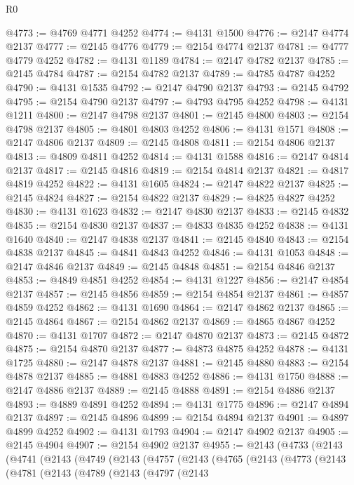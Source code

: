 \begin{lexlean}{R0}
\begin{coremodule}
@4773 := @4769 @4771 @4252
@4774 := @4131 @1500
@4776 := @2147 @4774 @2137
@4777 := @2145 @4776
@4779 := @2154 @4774 @2137
@4781 := @4777 @4779 @4252
@4782 := @4131 @1189
@4784 := @2147 @4782 @2137
@4785 := @2145 @4784
@4787 := @2154 @4782 @2137
@4789 := @4785 @4787 @4252
@4790 := @4131 @1535
@4792 := @2147 @4790 @2137
@4793 := @2145 @4792
@4795 := @2154 @4790 @2137
@4797 := @4793 @4795 @4252
@4798 := @4131 @1211
@4800 := @2147 @4798 @2137
@4801 := @2145 @4800
@4803 := @2154 @4798 @2137
@4805 := @4801 @4803 @4252
@4806 := @4131 @1571
@4808 := @2147 @4806 @2137
@4809 := @2145 @4808
@4811 := @2154 @4806 @2137
@4813 := @4809 @4811 @4252
@4814 := @4131 @1588
@4816 := @2147 @4814 @2137
@4817 := @2145 @4816
@4819 := @2154 @4814 @2137
@4821 := @4817 @4819 @4252
@4822 := @4131 @1605
@4824 := @2147 @4822 @2137
@4825 := @2145 @4824
@4827 := @2154 @4822 @2137
@4829 := @4825 @4827 @4252
@4830 := @4131 @1623
@4832 := @2147 @4830 @2137
@4833 := @2145 @4832
@4835 := @2154 @4830 @2137
@4837 := @4833 @4835 @4252
@4838 := @4131 @1640
@4840 := @2147 @4838 @2137
@4841 := @2145 @4840
@4843 := @2154 @4838 @2137
@4845 := @4841 @4843 @4252
@4846 := @4131 @1053
@4848 := @2147 @4846 @2137
@4849 := @2145 @4848
@4851 := @2154 @4846 @2137
@4853 := @4849 @4851 @4252
@4854 := @4131 @1227
@4856 := @2147 @4854 @2137
@4857 := @2145 @4856
@4859 := @2154 @4854 @2137
@4861 := @4857 @4859 @4252
@4862 := @4131 @1690
@4864 := @2147 @4862 @2137
@4865 := @2145 @4864
@4867 := @2154 @4862 @2137
@4869 := @4865 @4867 @4252
@4870 := @4131 @1707
@4872 := @2147 @4870 @2137
@4873 := @2145 @4872
@4875 := @2154 @4870 @2137
@4877 := @4873 @4875 @4252
@4878 := @4131 @1725
@4880 := @2147 @4878 @2137
@4881 := @2145 @4880
@4883 := @2154 @4878 @2137
@4885 := @4881 @4883 @4252
@4886 := @4131 @1750
@4888 := @2147 @4886 @2137
@4889 := @2145 @4888
@4891 := @2154 @4886 @2137
@4893 := @4889 @4891 @4252
@4894 := @4131 @1775
@4896 := @2147 @4894 @2137
@4897 := @2145 @4896
@4899 := @2154 @4894 @2137
@4901 := @4897 @4899 @4252
@4902 := @4131 @1793
@4904 := @2147 @4902 @2137
@4905 := @2145 @4904
@4907 := @2154 @4902 @2137
@4955 := @2143
    (@4733
      (@2143
        (@4741
          (@2143
            (@4749
              (@2143
                (@4757
                  (@2143
                    (@4765
                      (@2143
                        (@4773
                          (@2143
                            (@4781
                              (@2143
                                (@4789
                                  (@2143
                                    (@4797
                                      (@2143

\end{coremodule}
\end{lexlean}
